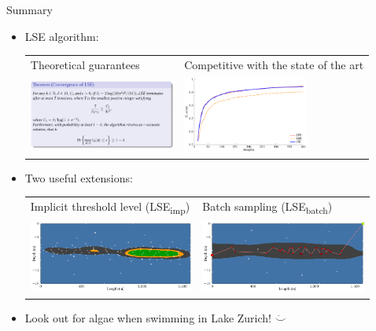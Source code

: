 \documentclass[10pt,mathserif]{beamer}
\newcommand{\acl}{\textsf{LSE}\xspace}
\newcommand{\iacl}{\textsf{LSE\textsubscript{imp}}\xspace}
\newcommand{\bacl}{\textsf{LSE\textsubscript{batch}}\xspace}
\newcommand{\sig}[2]{%
\begin{tabular}{r}
#1\\[-0.7em]
{\tiny \color{darkgray}\it #2\hspace{0.5em}}
\end{tabular}}
\begin{document}
\begin{frame}
\begin{center}
\large Summary
\end{center}
\vspace{-1.5em}
\begin{itemize}
\item<2-> \acl algorithm:\vspace{0.5em}
\begin{tabular}{>{\centering\arraybackslash} m{5cm}>{\centering\arraybackslash} m{5.5cm}}
Theoretical guarantees & Competitive with the state of the art\\
\includegraphics[height=0.9in]{figures/thm.png} & \includegraphics[height=1in]{figures/ev_chl_seq_long}
\end{tabular}
\item<3-> Two useful extensions:\vspace{0.5em}
\begin{tabular}{>{\centering\arraybackslash} m{5.25cm}>{\centering\arraybackslash} m{5.25cm}}
Implicit threshold level (\iacl) & Batch sampling (\bacl)\\
\includegraphics[height=0.95in]{figures/limno_bgape_imp_class_140} & \includegraphics[height=0.95in]{figures/limno_bgape_pp_30_2}
\end{tabular}
\item<4-> Look out for algae when swimming in Lake Zurich! {\color{blue}$\ddot\smile$}
\end{itemize}
\end{frame}

\end{document}
